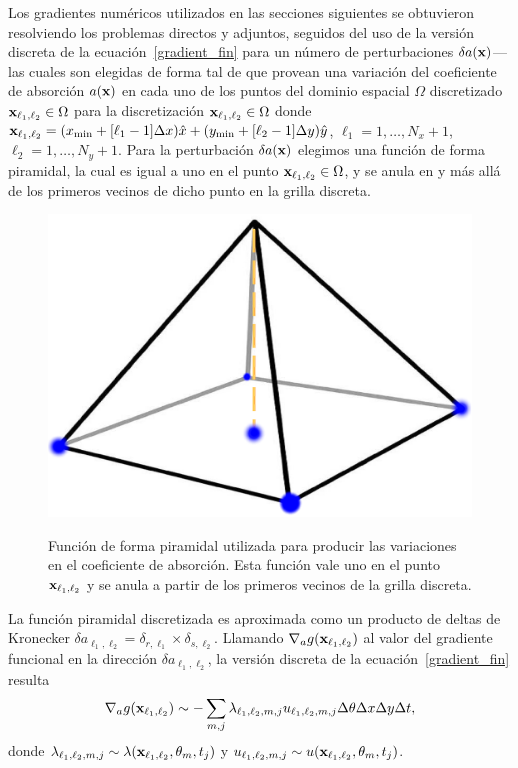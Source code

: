 Los gradientes numéricos utilizados en las secciones siguientes 
se obtuvieron resolviendo los problemas directos y adjuntos, 
seguidos del uso de la versión discreta de la ecuación~\eqref{gradient_fin} 
para un número de perturbaciones $\delta a(\mathbf{x})$---las cuales son elegidas 
de forma tal de que provean una variación del coeficiente de absorción $a(\mathbf{x})$ 
en cada uno de los puntos del dominio espacial $\Omega$ discretizado $\mathbf{x}_{\ell_1,\ell_2} \in \Omega$ 
para la discretización $\mathbf{x}_{\ell_1,\ell_2} \in \Omega$ donde 
$\mathbf{x}_{\ell_1,\ell_2} =(x_{\text{min}}+ [\ell_1-1]\Delta x)\hat x
+(y_{\text{min}}+[\ell_2-1]\Delta y)\hat y$, $\ell_1=1,\ldots,N_x+1$,
$\ell_2=1,\ldots,N_y+1$. Para la perturbación $\delta a(\mathbf{x})$ elegimos 
una función de forma piramidal, la cual es igual a uno en el punto 
 $\mathbf{x}_{\ell_1,\ell_2} \in \Omega$, y se anula en y más allá 
 de los primeros vecinos de dicho punto en la grilla discreta. 
 \begin{figure}[h!]
\centering
  \includegraphics[width=0.5\linewidth]{figuras/piramide.eps}\\
  \caption{
Función de forma piramidal utilizada para producir las variaciones 
en el coeficiente de absorción. Esta función vale uno en el punto $\mathbf{x}_{\ell_1,\ell_2}$ 
y se anula a partir de los primeros vecinos de la grilla discreta.}
 \label{fig:priamid}
\end{figure}
 La función piramidal discretizada es aproximada como un producto 
 de deltas de Kronecker $\delta a_{\ell_1,\ell_2}=\delta_{r,\ell_1}\times\delta_{s,\ell_2}$.
 Llamando $\nabla_a g(\mathbf{x}_{\ell_1,\ell_2})$ al valor del gradiente funcional 
 en la dirección $\delta a_{\ell_1,\ell_2}$, la versión discreta 
 de la ecuación~\eqref{gradient_fin} resulta
\begin{equation}
\nabla_a g(\mathbf{x}_{\ell_1,\ell_2})  \sim -\sum_{m,j}  \lambda_{\ell_1,\ell_2,m,j}u_{\ell_1,\ell_2,m,j} \Delta \theta \Delta x \Delta y \Delta t,
\label{eq:FDwin22}
\end{equation}
donde $\lambda_{\ell_1,\ell_2,m,j}\sim
\lambda(\mathbf{x}_{\ell_1,\ell_2},\theta_m,t_j)$ y 
$u_{\ell_1,\ell_2,m,j} \sim u(\mathbf{x}_{\ell_1,\ell_2},\theta_m,t_j)$. 
